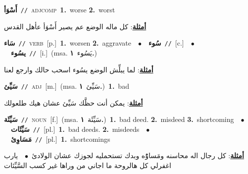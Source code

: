 \documentclass[10pt,a4paper,twoside]{article} %
\begin{document}
\begin{multicols}{2}
{\setlength\topsep{0pt}\textbf{\foreignlanguage{arabic}{أَسْوَأ}}\ {\color{gray}\texttt{//}\color{black}}\ \textsc{adj\textunderscore comp}\ \textbf{1.}~worse  \textbf{2.}~worst\  \begin{flushright}\color{gray}\foreignlanguage{arabic}{\textbf{\underline{\foreignlanguage{arabic}{أمثلة}}}: كل ماله الوضع عم يصير أَسْوَأ عأهل القدس}\end{flushright}\color{black}} \vspace{2mm}

{\setlength\topsep{0pt}\textbf{\foreignlanguage{arabic}{سَاء}}\ {\color{gray}\texttt{//}\color{black}}\ \textsc{verb}\ [p.]\ \textbf{1.}~worsen  \textbf{2.}~aggravate\ \ $\bullet$\ \ \setlength\topsep{0pt}\textbf{\foreignlanguage{arabic}{سُوء}}\ {\color{gray}\texttt{//}\color{black}}\ [c.]\ \ $\bullet$\ \ \setlength\topsep{0pt}\textbf{\foreignlanguage{arabic}{يسُوء}}\ {\color{gray}\texttt{//}\color{black}}\ [i.]\ \color{gray}(msa. \foreignlanguage{arabic}{يَسُوء}~\foreignlanguage{arabic}{\textbf{١.}})\color{black}\  \begin{flushright}\color{gray}\foreignlanguage{arabic}{\textbf{\underline{\foreignlanguage{arabic}{أمثلة}}}: لما يبلِّش الوضع يسُوء اسحب حالك وارجع لعنا}\end{flushright}\color{black}} \vspace{2mm}

{\setlength\topsep{0pt}\textbf{\foreignlanguage{arabic}{سَيِّئ}}\ {\color{gray}\texttt{//}\color{black}}\ \textsc{adj}\ [m.]\ \color{gray}(msa. \foreignlanguage{arabic}{سَيِّئ}~\foreignlanguage{arabic}{\textbf{١.}})\color{black}\ \textbf{1.}~bad\  \begin{flushright}\color{gray}\foreignlanguage{arabic}{\textbf{\underline{\foreignlanguage{arabic}{أمثلة}}}: يمكن أنت حظَّك سَيِّئ عشان هيك طلعولك}\end{flushright}\color{black}} \vspace{2mm}

{\setlength\topsep{0pt}\textbf{\foreignlanguage{arabic}{سَيِّئَة}}\ {\color{gray}\texttt{//}\color{black}}\ \textsc{noun}\ [f.]\ \color{gray}(msa. \foreignlanguage{arabic}{سَيِّئَة}~\foreignlanguage{arabic}{\textbf{١.}})\color{black}\ \textbf{1.}~bad deed.  \textbf{2.}~misdeed  \textbf{3.}~shortcoming\ \ $\bullet$\ \ \setlength\topsep{0pt}\textbf{\foreignlanguage{arabic}{سَيِّئَات}}\ {\color{gray}\texttt{//}\color{black}}\ [pl.]\ \textbf{1.}~bad deeds.  \textbf{2.}~misdeeds\ \ $\bullet$\ \ \setlength\topsep{0pt}\textbf{\foreignlanguage{arabic}{مَسَاوِئ}}\ {\color{gray}\texttt{//}\color{black}}\ [pl.]\ \textbf{1.}~shortcomings\  \begin{flushright}\color{gray}\foreignlanguage{arabic}{\textbf{\underline{\foreignlanguage{arabic}{أمثلة}}}: كل رجال اله محاسنه ومَساوُْه وبدك تستحمليه لجوزك عشان الولادئ\ $\bullet$\ \  يارب اغفرلي كل هالروحة ما اجاني من وراها غير كسب السَّيِّئات}\end{flushright}\color{black}} \vspace{2mm}


\end{multicols}
\end{document}
